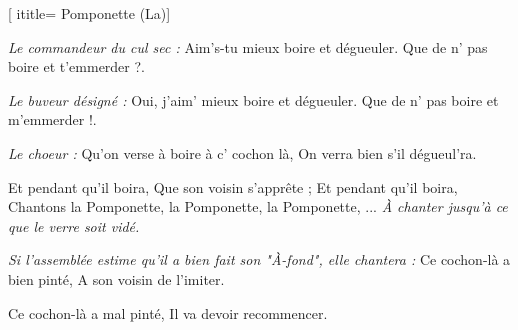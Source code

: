  [
ititle= {Pomponette (La)}]


\beginverse
\textit {Le commandeur du cul sec :}
Aim's-tu mieux boire et dégueuler.
Que de n' pas boire et t'emmerder ?.
\endverse

\beginverse
\textit {Le buveur désigné :}
Oui, j'aim' mieux boire et dégueuler.
Que de n' pas boire et m'emmerder !.
\endverse

\beginverse
\textit {Le choeur :}
Qu'on verse à boire à c' cochon là,
On verra bien s'il dégueul'ra.
\endverse

\beginverse
Et pendant qu'il boira,
Que son voisin s'apprête ;
Et pendant qu'il boira,
Chantons la Pomponette, la Pomponette, la Pomponette, ...
\textit {À chanter jusqu'à ce que le verre soit vidé.}
\endverse

\beginverse
\textit {Si l'assemblée estime qu'il a bien fait son "À-fond", elle chantera :}
Ce cochon-là a bien pinté,
A son voisin de l'imiter.
\endverse

\beginverse
{}
Ce cochon-là a mal pinté,
Il va devoir recommencer.
\endverse

\endsong